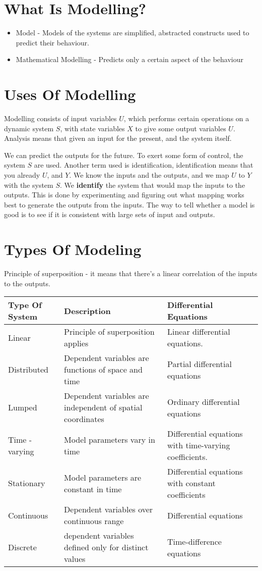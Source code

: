\documentclass[11pt]{report}
\begin{document}
\section{What Is Modelling?}
\label{sec:orgd1aab32}
\begin{itemize}
\item Model - Models of the systems are simplified, abstracted constructs used to predict their behaviour.
\item Mathematical Modelling - Predicts only a certain aspect of the behaviour
\end{itemize}
\section{Uses Of Modelling}
\label{sec:org7913f30}
Modelling consists of input variables \(U\), which performs certain operations on a dynamic system \(S\), with state variables \(X\) to give some output variables \(U\).
Analysis means that given an input for the present, and the system itself.

We can predict the outputs for the future. To exert some form of control, the system \(S\) are used. Another term used is identification, identification means that you already \(U\), and \(Y\). We know the inputs and the outputs, and we map \(U\) to \(Y\) with the system \(S\). We \textbf{identify} the system that would map the inputs to the outputs. This is done by experimenting and figuring out what mapping works best to generate the outputs from the inputs. The way to tell whether a model is good is to see if it is consistent with large sets of input and outputs.
\section{Types Of Modeling}
\label{sec:orgb0f338a}
Principle of superposition - it means that there's a linear correlation of the inputs to the outputs.
\begin{center}
\begin{tabular}{lll}
\hline
Type Of System & Description & Differential Equations\\
\hline
Linear & Principle of superposition applies & Linear differential equations.\\
Distributed & Dependent variables are functions of space and time & Partial differential equations\\
Lumped & Dependent variables are independent of spatial coordinates & Ordinary differential equations\\
Time - varying & Model parameters vary in time & Differential equations with time-varying coefficients.\\
Stationary & Model parameters are constant in time & Differential equations with constant coefficients\\
Continuous & Dependent variables over continuous range & Differential equations\\
Discrete & dependent variables defined only for distinct values & Time-difference equations\\
\hline
\end{tabular}
\end{center}
\end{document}
